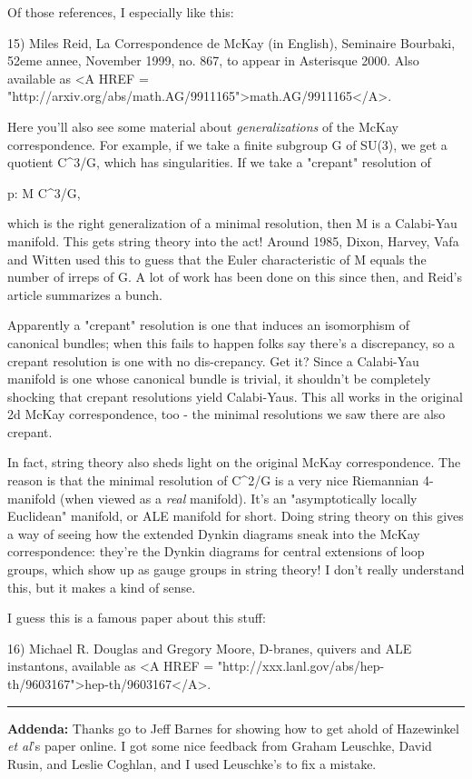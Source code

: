 Of those references, I especially like this:

15) Miles Reid, La Correspondence de McKay (in English), 
Seminaire Bourbaki, 52eme annee, November 1999, no. 867, 
to appear in Asterisque 2000.  Also available as <A HREF = 
"http://arxiv.org/abs/math.AG/9911165">math.AG/9911165</A>.

Here you'll also see some material about \emph{generalizations}
of the McKay correspondence.  For example, if we take a finite
subgroup G of SU(3), we get a quotient C^{3}/G, which has 
singularities.  If we take a "crepant" resolution of 

p: M \to  C^{3}/G,

which is the right generalization of a minimal resolution, then
M is a Calabi-Yau manifold.  This gets string theory into the act!
Around 1985, Dixon, Harvey, Vafa and Witten used this to guess 
that the Euler characteristic of M equals the number of irreps of G.
A lot of work has been done on this since then, and Reid's article
summarizes a bunch.

Apparently a "crepant" resolution is one that induces 
an isomorphism of canonical bundles; when this fails to happen
folks say there's a discrepancy, so a crepant resolution is one
with no dis-crepancy.  Get it?  
Since a Calabi-Yau 
manifold is one whose canonical bundle is trivial, it shouldn't
be completely shocking that crepant
resolutions yield Calabi-Yaus.  This all works in the original
2d McKay correspondence, too - the minimal resolutions we saw
there are also crepant.  
 
In fact, string theory also sheds light on the original McKay
correspondence.  The reason is that the minimal resolution of
C^{2}/G is a very nice Riemannian 4-manifold (when viewed as a
\emph{real} manifold).  It's an "asymptotically locally
Euclidean" manifold, or ALE manifold for short.  Doing string
theory on this gives a way of seeing how the extended Dynkin diagrams
sneak into the McKay correspondence: they're the Dynkin diagrams for
central extensions of loop groups, which show up as gauge groups in
string theory!  I don't really understand this, but it makes a kind of
sense.

I guess this is a famous paper about this stuff:

16) Michael R. Douglas and Gregory Moore, D-branes, quivers and ALE
instantons, available as <A HREF = "http://xxx.lanl.gov/abs/hep-th/9603167">hep-th/9603167</A>.

\par\noindent\rule{\textwidth}{0.4pt}
\textbf{Addenda:} 
Thanks go to Jeff Barnes for showing how to get ahold of Hazewinkel
\emph{et al}'s paper online.
I got some nice feedback from Graham Leuschke, David
Rusin, and Leslie Coghlan, and I used Leuschke's to fix a mistake. 

